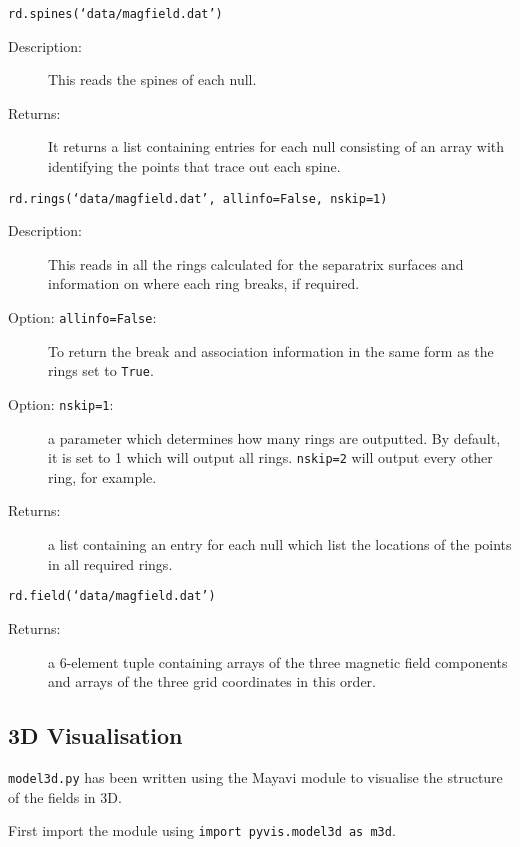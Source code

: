 \documentclass[12pt]{article}
\begin{document}
      \texttt{rd.spines(`data/magfield.dat')}

      \begin{description}
        \item [Description:] This reads the spines of each null.
        \item [Returns:] It returns a list containing entries for each null consisting of an array with identifying the points that trace out each spine.
      \end{description}

      \texttt{rd.rings(`data/magfield.dat', allinfo=False, nskip=1)}

      \begin{description}
        \item [Description:] This reads in all the rings calculated for the separatrix surfaces and information on where each ring breaks, if required.
        \item [Option: \texttt{allinfo=False}:] To return the break and association information in the same form as the rings set to \texttt{True}.
        \item [Option: \texttt{nskip=1}:] a parameter which determines how many rings are outputted. By default, it is set to 1 which will output all rings. \texttt{nskip=2} will output every other ring, for example.
        \item [Returns:] a list containing an entry for each null which list the locations of the points in all required rings.
      \end{description}

      \texttt{rd.field(`data/magfield.dat')}

      \begin{description}
        \item [Returns:] a 6-element tuple containing arrays of the three magnetic field components and arrays of the three grid coordinates in this order.
      \end{description}

    \subsection{3D Visualisation}

      \texttt{model3d.py} has been written using the Mayavi module to visualise the structure of the fields in 3D.

      First import the module using \texttt{import pyvis.model3d as m3d}.
\end{document}
